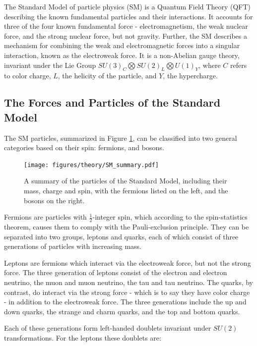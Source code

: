 
The Standard Model of particle physics (SM) is a Quantum Field Theory (QFT) describing the known fundamental particles and their interactions. It accounts for three of the four known fundamental force - electromagnetism, the weak nuclear force, and the strong nuclear force, but not gravity. Further, the SM describes a mechanism for combining the weak and electromagnetic forces into a singular interaction, known as the electroweak force. It is a non-Abelian gauge theory, invariant under the Lie Group $SU(3)_C\bigotimes SU(2)_L\bigotimes U(1)_Y$, where $C$ refers to color charge, $L$, the helicity of the particle, and $Y$, the hypercharge.

\subsection{The Forces and Particles of the Standard Model}
\label{sec:forcesParticles}

The SM particles, summarized in Figure \ref{fig:SM_summary}, can be classified into two general categories based on their spin: fermions, and bosons. 

\begin{figure}[H]
\centering
   \texttt{[image: figures/theory/SM\_summary.pdf]}
\caption{A summary of the particles of the Standard Model, including their mass, charge and spin, with the fermions listed on the left, and the bosons on the right. \cite{oerter2006the}}
\label{fig:SM_summary}
\end{figure}

Fermions are particles with $\frac{1}{2}$-integer spin, which according to the spin-statistics theorem, causes them to comply with the Pauli-exclusion principle. They can be separated into two groups, leptons and quarks, each of which consist of three generations of particles with increasing mass.

Leptons are fermions which interact via the electroweak force, but not the strong force. The three generation of leptons consist of the electron and electron neutrino, the muon and muon neutrino, the tau and tau neutrino. The quarks, by contrast, do interact via the strong force - which is to say they have color charge - in addition to the electroweak force. The three generations include the up and down quarks, the strange and charm quarks, and the top and bottom quarks. 

Each of these generations form left-handed doublets invariant under $SU(2)$ transformations. For the leptons these doublets are:

